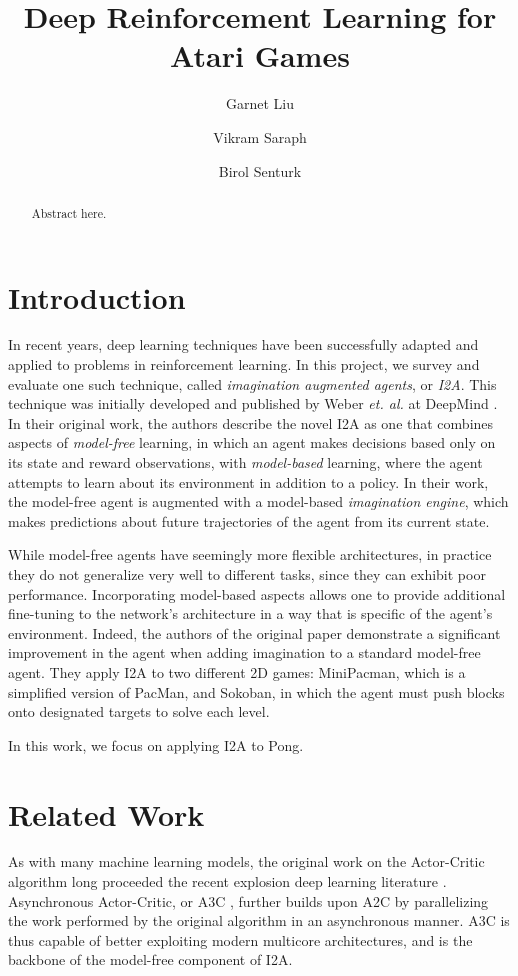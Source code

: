 \documentclass[10pt, twocolumn]{article}
\title{Deep Reinforcement Learning for Atari Games}
\author{Garnet Liu \and Vikram Saraph \and Birol Senturk}
\begin{document}
\maketitle

\begin{abstract}

Abstract here.

\end{abstract}

\section{Introduction}

In recent years, deep learning techniques have been successfully adapted and applied to problems
in reinforcement learning. In this project, we survey and evaluate one such technique, called \emph{imagination augmented agents}, or \emph{I2A}. This technique was initially developed and published by Weber \emph{et. al.} at DeepMind \cite{I2A}. In their original
work, the authors describe the novel I2A as one that combines aspects of \emph{model-free} learning, in which an agent makes decisions based only on its state and reward observations, with \emph{model-based} learning, where the agent attempts to learn
about its environment in addition to a policy. In their work, the model-free agent is augmented with a model-based \emph{imagination engine}, which makes predictions about future trajectories of the agent from its current state.

While model-free agents have seemingly more flexible architectures, in practice they do not generalize very well to different tasks,
since they can exhibit poor performance. Incorporating model-based aspects allows one to provide additional fine-tuning to the network's architecture in a way that is specific of the 
agent's environment. Indeed, the authors of the original paper demonstrate a significant improvement in the agent when adding 
imagination to a standard model-free agent. They apply I2A to two different 2D games: MiniPacman, which is a simplified version of 
PacMan, and Sokoban, in which the agent must push blocks onto designated targets to solve each level.

In this work, we focus on applying I2A to Pong.

\section{Related Work}
As with many machine learning models, the original work on the Actor-Critic algorithm long proceeded the recent explosion deep learning literature \cite{A2C}. Asynchronous Actor-Critic, or A3C \cite{A3C}, further builds upon A2C by parallelizing the work performed by the original algorithm in an asynchronous manner. A3C is thus capable of better exploiting modern multicore architectures, and is the backbone of the model-free component of I2A.
\end{document}
